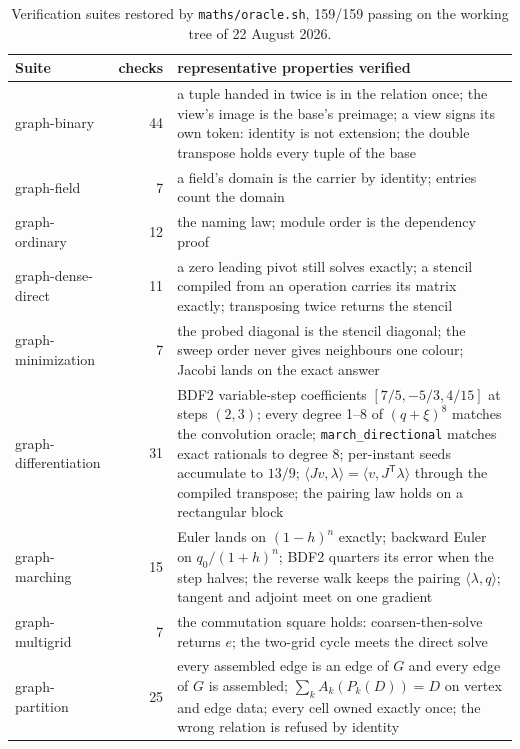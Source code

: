 \documentclass[11pt,a4paper]{article}
\newcommand{\tr}{^{\mathsf T}}
\newcommand{\code}[1]{\texttt{#1}}
\begin{document}
\begin{table}[H]
\centering\footnotesize
\begin{tabular}{@{}lrp{10.2cm}@{}}
\toprule
Suite & checks & representative properties verified \\
\midrule
graph-binary & 44 & a tuple handed in twice is in the relation once; the view's image is the base's preimage; a view signs its own token: identity is not extension; the double transpose holds every tuple of the base \\
graph-field & 7 & a field's domain is the carrier by identity; entries count the domain \\
graph-ordinary & 12 & the naming law; module order is the dependency proof \\
graph-dense-direct & 11 & a zero leading pivot still solves exactly; a stencil compiled from an operation carries its matrix exactly; transposing twice returns the stencil \\
graph-minimization & 7 & the probed diagonal is the stencil diagonal; the sweep order never gives neighbours one colour; Jacobi lands on the exact answer \\
graph-differentiation & 31 & BDF2 variable-step coefficients $[7/5,-5/3,4/15]$ at steps $(2,3)$; every degree 1--8 of $(q+\xi)^8$ matches the convolution oracle; \code{march\_directional} matches exact rationals to degree 8; per-instant seeds accumulate to $13/9$; $\langle Jv,\lambda\rangle = \langle v, J\tr\lambda\rangle$ through the compiled transpose; the pairing law holds on a rectangular block \\
graph-marching & 15 & Euler lands on $(1-h)^n$ exactly; backward Euler on $q_0/(1+h)^n$; BDF2 quarters its error when the step halves; the reverse walk keeps the pairing $\langle\lambda,q\rangle$; tangent and adjoint meet on one gradient \\
graph-multigrid & 7 & the commutation square holds: coarsen-then-solve returns $e$; the two-grid cycle meets the direct solve \\
graph-partition & 25 & every assembled edge is an edge of $G$ and every edge of $G$ is assembled; $\sum_kA_k(P_k(D))=D$ on vertex and edge data; every cell owned exactly once; the wrong relation is refused by identity \\
\bottomrule
\end{tabular}
\caption{Verification suites restored by \code{maths/oracle.sh}, 159/159 passing on the working tree of 22 August 2026.}
\label{tab:suites}
\end{table}
\end{document}
